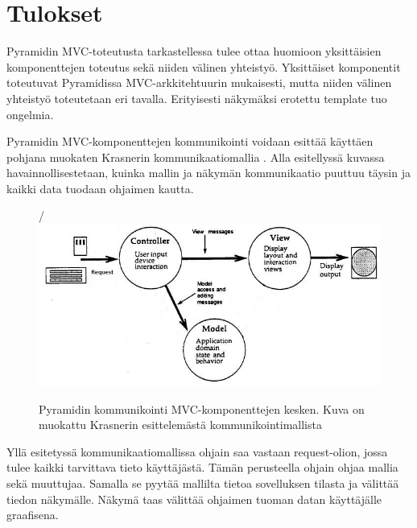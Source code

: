 \documentclass[finnish,utf8,nonumbib,palatino,kandi]{gradu2}
\begin{document}
\section{Tulokset}
Pyramidin MVC-toteutusta tarkastellessa tulee ottaa huomioon yksittäisien komponenttejen toteutus sekä niiden välinen yhteistyö. Yksittäiset komponentit toteutuvat Pyramidissa MVC-arkkitehtuurin mukaisesti, mutta niiden välinen yhteistyö
toteutetaan eri tavalla. Erityisesti näkymäksi erotettu template tuo ongelmia. 

Pyramidin MVC-komponenttejen kommunikointi voidaan esittää käyttäen pohjana muokaten Krasnerin kommunikaatiomallia \cite{Krasner:desc}. 
Alla esitellyssä kuvassa havainnollisestetaan, kuinka mallin ja näkymän kommunikaatio puuttuu täysin ja kaikki data tuodaan ohjaimen kautta.
\newpage
\begin{figure}[h]
\centering/
\includegraphics[scale=0.85]{pyramid_mvc.jpg}
\caption{Pyramidin kommunikointi MVC-komponenttejen kesken. Kuva on muokattu Krasnerin esittelemästä kommunikointimallista \cite{Krasner:desc}  }
\end{figure}

Yllä esitetyssä kommunikaatiomallissa ohjain saa vastaan request-olion, jossa tulee kaikki tarvittava tieto käyttäjästä. Tämän perusteella ohjain ohjaa mallia
sekä muuttujaa. Samalla se pyytää mallilta tietoa sovelluksen tilasta ja välittää tiedon näkymälle. Näkymä taas välittää ohjaimen tuoman datan käyttäjälle graafisena.
\end{document}
